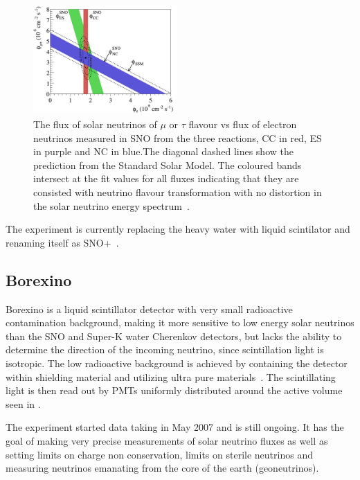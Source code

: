 \begin{figure}[h!]
\centering
  \centering
\includegraphics[width=0.49\textwidth]{figures/fixSNO.jpeg}
\vspace{2mm}
\caption{The flux of solar neutrinos of $\mu$ or $\tau$ flavour vs flux of electron neutrinos measured in SNO from the three reactions, CC in red, ES in purple and NC in blue.The diagonal dashed lines show the prediction from the Standard Solar Model. The coloured bands intersect at the fit values for all fluxes indicating that they are consisted with neutrino flavour transformation with no distortion in the solar neutrino energy spectrum~\cite{98Ahmad}.}
\label{fig:SNO2}
\end{figure}

The experiment is currently replacing the heavy water with liquid scintilator and renaming itself as SNO+~\cite{42SNO+}.

\subsection{Borexino}
Borexino is a liquid scintillator detector with very small radioactive contamination background, making it more sensitive to low energy solar neutrinos than the SNO and Super-K water Cherenkov detectors, but lacks the ability to determine the direction of the incoming neutrino, since scintillation light is isotropic. The low radioactive background is achieved by containing the detector within shielding material and utilizing ultra pure materials~\cite{63Borexino}. The scintillating light is then read out by PMTs uniformly distributed around the active volume seen in .

The experiment started data taking in May 2007 and is still ongoing. It has the goal of making  very precise measurements of solar neutrino fluxes as well as setting limits on charge non conservation, limits on sterile neutrinos and measuring neutrinos emanating from the core of the earth (geoneutrinos).

